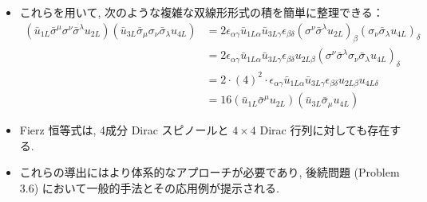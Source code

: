 \documentclass[a4paper,12pt]{article}
\begin{document}
\begin{itemize}
  \item これらを用いて, 次のような複雑な双線形形式の積を簡単に整理できる：
  \begin{align*}
  (\bar{u}_{1L} \bar{\sigma}^\mu \sigma^\nu \bar{\sigma}^\lambda u_{2L})(\bar{u}_{3L} \bar{\sigma}_\mu \sigma_\nu \bar{\sigma}_\lambda u_{4L})&= 2 \epsilon_{\alpha\gamma} \bar{u}_{1L\alpha} \bar{u}_{3L\gamma} \epsilon_{\beta\delta} (\sigma^\nu \bar{\sigma}^\lambda u_{2L})_\beta (\sigma_\nu \bar{\sigma}_\lambda u_{4L})_\delta \\
  &= 2 \epsilon_{\alpha\gamma} \bar{u}_{1L\alpha} \bar{u}_{3L\gamma} \epsilon_{\beta\delta}u_{2L\beta} (\sigma^\nu \bar{\sigma}^\lambda \sigma_\nu \bar{\sigma}_\lambda u_{4L})_\delta \\
  &= 2 \cdot (4)^2 \cdot \epsilon_{\alpha\gamma} \bar{u}_{1L\alpha} \bar{u}_{3L\gamma} \epsilon_{\beta\delta} u_{2L\beta} u_{4L\delta} \\
  &= 16 (\bar{u}_{1L} \bar{\sigma}^\mu u_{2L})(\bar{u}_{3L} \bar{\sigma}_\mu u_{4L}) \tag{3.82}
  \end{align*}

  \item Fierz 恒等式は, 4成分 Dirac スピノールと $4 \times 4$ Dirac 行列に対しても存在する.

  \item これらの導出にはより体系的なアプローチが必要であり, 後続問題 (Problem 3.6) において一般的手法とその応用例が提示される.
\end{itemize}
\end{document}
